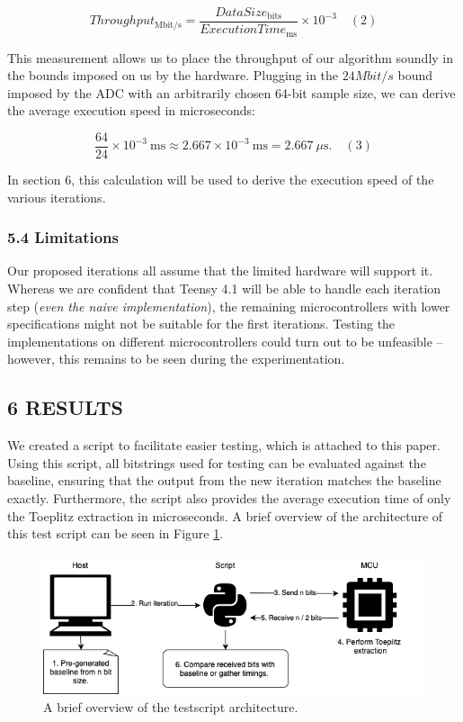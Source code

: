 \documentclass{sigchi}
\begin{document}
\[
Throughput_\mathrm{Mbit/s}
= \frac{DataSize_\mathrm{bits}}{ExecutionTime_\mathrm{ms}}
\times 10^{-3}
\phantom{12}(2)
\]

This measurement allows us to place the throughput of our algorithm soundly in the bounds imposed on us by the hardware. Plugging in the \(24 Mbit/s\) bound imposed by the ADC with an arbitrarily chosen 64-bit sample size, we can derive the average execution speed in microseconds:

\[
\frac{64}{24}\times10^{-3}\ \mathrm{ms}
\approx 2.667\times10^{-3}\ \mathrm{ms}
=2.667\ \mu\mathrm{s}.
\phantom{12}(3)
\]

In section 6, this calculation will be used to derive the execution speed of the various iterations.

\subsubsection{5.4 Limitations}\label{limitations}

Our proposed iterations all assume that the limited hardware will support it. Whereas we are confident that Teensy 4.1 will be able to handle each iteration step (\emph{even the naive implementation}), the remaining microcontrollers with lower specifications might not be suitable for the first iterations. Testing the implementations on different microcontrollers could turn out to be unfeasible -- however, this remains to be seen during the experimentation.

\subsection{6 RESULTS}\label{results}

We created a script to facilitate easier testing, which is attached to this paper. Using this script, all bitstrings used for testing can be evaluated against the baseline, ensuring that the output from the new iteration matches the baseline exactly. Furthermore, the script also provides the average execution time of only the Toeplitz extraction in microseconds. A brief overview of the architecture of this test script can be seen in Figure \ref{fig:testscript-architecture}.

\begin{figure}[!t] \centering
\includegraphics[width=\textwidth]{img/testscript.png} \caption{A brief overview
of the testscript architecture.} \label{fig:testscript-architecture}
\end{figure}
\end{document}
